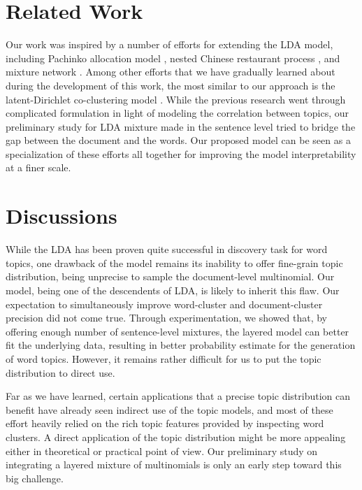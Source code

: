 \section{Related Work} \label{s:related-work} 

Our work was inspired by a number of efforts for extending the LDA model,
including Pachinko allocation model \cite{li2006pachinko}, nested Chinese
restaurant process \cite{blei2004hierarchical}, and mixture network
\cite{heinrich2009generic}.  Among other efforts that we have gradually learned
about during the development of this work, the most similar to our approach is
the latent-Dirichlet co-clustering model \cite{shafiei2006latent}.  While the
previous research went through complicated formulation in light of modeling the
correlation between topics, our preliminary study for LDA mixture made in the
sentence level tried to bridge the gap between the document and the words.  Our
proposed model can be seen as a specialization of these efforts all together
for improving the model interpretability at a finer scale.

\section{Discussions} \label{s:discussions} 
While the LDA has been proven quite successful in discovery task for word
topics, one drawback of the model remains its inability to offer fine-grain
topic distribution, being unprecise to sample the document-level multinomial.
Our model, being one of the descendents of LDA, is likely to inherit this flaw.
Our expectation to simultaneously improve word-cluster and document-cluster
precision did not come true.  Through experimentation, we showed that, by
offering enough number of sentence-level mixtures, the layered model can better
fit the underlying data, resulting in better probability estimate for the
generation of word topics.  However, it remains rather difficult for us to put
the topic distribution to direct use.  

Far as we have learned, certain applications that a precise topic distribution
can benefit have already seen indirect use of the topic models, and most of
these effort heavily relied on the rich topic features provided by inspecting
word clusters.  A direct application of the topic distribution might be more
appealing either in theoretical or practical point of view.  Our preliminary
study on integrating a layered mixture of multinomials is only an early step
toward this big challenge.

